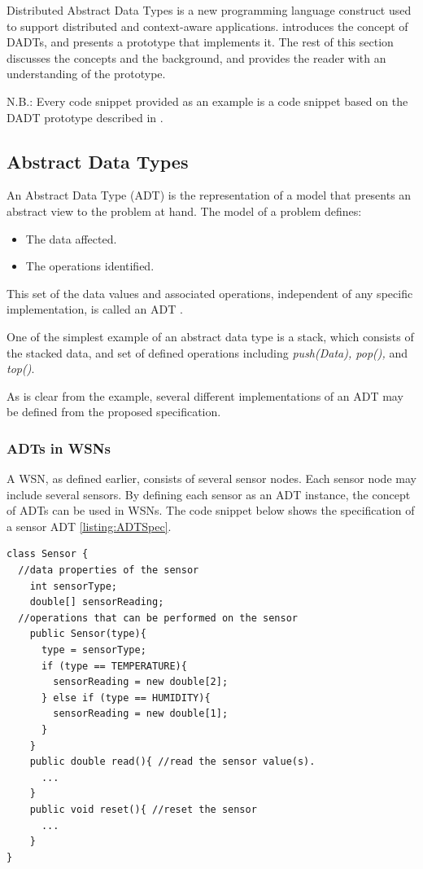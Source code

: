 Distributed Abstract Data Types is a new programming language construct used to
support distributed and context-aware applications. \cite{migliavacca_DADT:2006}
introduces the concept of DADTs, and presents a prototype that implements it.
The rest of this section discusses the concepts and the background, and
provides the reader with an understanding of the prototype.

N.B.: Every code snippet provided as an example is a code snippet based on the
DADT prototype described in \cite{migliavacca_DADT:2006}.

\subsection{Abstract Data Types}
An Abstract Data Type (ADT) is the representation of a model that presents an
abstract view to the problem at hand. The model of a problem defines:

\begin{itemize}
  \item The data affected.
  \item The operations identified.
\end{itemize}

This set of the data values and associated operations, independent of any
specific implementation, is called an ADT \cite{ADDREF_NIST}. 

One of the simplest example of an abstract data type is a stack, which
consists of the stacked data, and set of defined operations including \emph{push(Data), pop(),}
and \emph{top()}.

As is clear from the example, several different implementations of an ADT may
be defined from the proposed specification.

\subsubsection{ADTs in WSNs} \label{subsubsec:ADTsinWSN}

A WSN, as defined earlier, consists of several sensor nodes. Each sensor node
may include several sensors. By defining each sensor as
an ADT instance, the concept of ADTs can be used in WSNs. The code snippet below
shows the specification of a sensor ADT \ref{listing:ADTSpec}.   
  
\lstset{language = Java}  
 \begin{lstlisting}[frame=trbl, basewidth={0.55em, 0.6em}, captionpos=b, basicstyle=\ttfamily\footnotesize, breaklines, caption = Sensor ADT specification (reproduced from \cite{migliavacca_DADT:2006}), label = listing:ADTSpec ]
class Sensor {
  //data properties of the sensor 
    int sensorType;
    double[] sensorReading;
  //operations that can be performed on the sensor  
	public Sensor(type){
	  type = sensorType;
	  if (type == TEMPERATURE){
		sensorReading = new double[2];
	  }	else if (type == HUMIDITY){
		sensorReading = new double[1];
	  }
	}
    public double read(){ //read the sensor value(s).
	  ...
	} 
	public void reset(){ //reset the sensor
	  ...
	}
}
\end{lstlisting}

